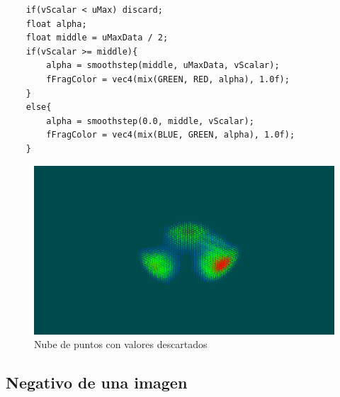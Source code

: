 \begin{verbatim}
    if(vScalar < uMax) discard;	
    float alpha;
    float middle = uMaxData / 2;
    if(vScalar >= middle){
        alpha = smoothstep(middle, uMaxData, vScalar);
        fFragColor = vec4(mix(GREEN, RED, alpha), 1.0f);
    }
    else{
        alpha = smoothstep(0.0, middle, vScalar);
        fFragColor = vec4(mix(BLUE, GREEN, alpha), 1.0f);
    }
\end{verbatim}

\begin{figure}[ht]
	\centering	
	\includegraphics[width=\textwidth]{figures/mycloud2.png}
	\caption{Nube de puntos con valores descartados}
	\label{fig:mycloud2}
\end{figure}

\subsection{Negativo de una imagen}
\label{makereference5.5.6}

